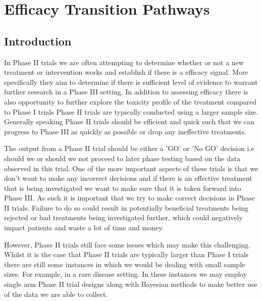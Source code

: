 
\chapter{Efficacy Transition Pathways} %

\label{etp} %


\section{Introduction}
\label{etp:Introduction}

In Phase \RN{2} trials we are often attempting to determine whether or not a new treatment or intervention works and establish if there is a efficacy signal. More specifically they aim to determine if there is sufficient level of evidence to warrant further research in a Phase \RN{3} setting. In addition to assessing efficacy there is also opportunity to further explore the toxicity profile of the treatment compared to Phase \RN{1} trials Phase \RN{2} trials are typically conducted using a larger sample size. Generally speaking Phase \RN{2} trials should be efficient and quick such that we can progress to Phase \RN{3} as quickly as possible or drop any ineffective treatments.

The output from a Phase \RN{2} trial should be either a 'GO' or 'No GO' decision i.e should we or should we not proceed to later phase testing based on the data observed in this trial. One of the more important aspects of these trials is that we don't want to make any incorrect decisions and if there is an effective treatment that is being investigated we want to make sure that it is taken forward into Phase \RN{3}. As such it is important that we try to make correct decisions in Phase \RN{2} trials. Failure to do so could result in potentially beneficial treatments being rejected or bad treatments being investigated further, which could negatively impact patients and waste a lot of time and money. 

However, Phase \RN{2} trials still face some issues which may make this challenging. Whilst it is the case that Phase \RN{2} trials are typically larger than Phase \RN{1} trials there are still some instances in which we would be dealing with small sample sizes. For example, in a rare disease setting. In these instances we may employ single arm Phase \RN{2} trial designs along with Bayesian methods to make better use of the data we are able to collect. 

